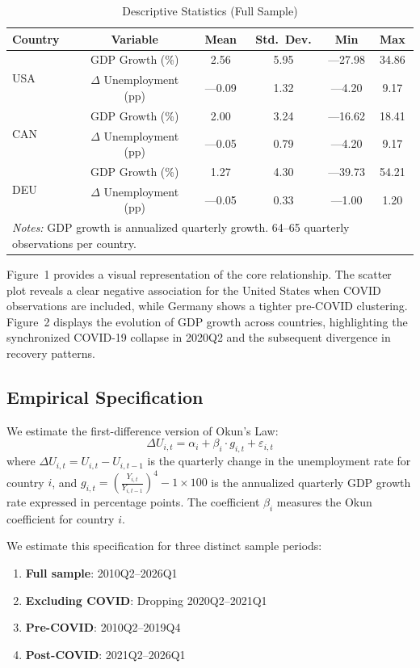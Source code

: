 \documentclass[12pt,a4paper]{article}
\begin{document}
\begin{table}[H]
\centering
\caption{Descriptive Statistics (Full Sample)}
\label{tab:descriptive}
\begin{tabular}{lccccc}
\toprule
Country & Variable & Mean & Std.~Dev. & Min & Max \\
\midrule
\multirow{2}{*}{USA} & GDP Growth (\%) & 2.56 & 5.95 & ---27.98 & 34.86 \\
 & $\Delta$ Unemployment (pp) & ---0.09 & 1.32 & ---4.20 & 9.17 \\
\midrule
\multirow{2}{*}{CAN} & GDP Growth (\%) & 2.00 & 3.24 & ---16.62 & 18.41 \\
 & $\Delta$ Unemployment (pp) & ---0.05 & 0.79 & ---4.20 & 9.17 \\
\midrule
\multirow{2}{*}{DEU} & GDP Growth (\%) & 1.27 & 4.30 & ---39.73 & 54.21 \\
 & $\Delta$ Unemployment (pp) & ---0.05 & 0.33 & ---1.00 & 1.20 \\
\bottomrule
\multicolumn{6}{l}{\textit{Notes:} GDP growth is annualized quarterly growth. 64--65 quarterly observations per country.}
\end{tabular}
\end{table}

Figure~1 provides a visual representation of the core relationship. The scatter plot reveals a clear negative association for the United States when COVID observations are included, while Germany shows a tighter pre-COVID clustering. Figure~2 displays the evolution of GDP growth across countries, highlighting the synchronized COVID-19 collapse in 2020Q2 and the subsequent divergence in recovery patterns.

\subsection{Empirical Specification}

We estimate the first-difference version of Okun's Law:
\[
\Delta U_{i,t} = \alpha_i + \beta_i \cdot g_{i,t} + \varepsilon_{i,t}
\]
where $\Delta U_{i,t} = U_{i,t} - U_{i,t-1}$ is the quarterly change in the unemployment rate for country $i$, and $g_{i,t} = \left(\frac{Y_{i,t}}{Y_{i,t-1}}\right)^4 - 1 \times 100$ is the annualized quarterly GDP growth rate expressed in percentage points. The coefficient $\beta_i$ measures the Okun coefficient for country $i$.

We estimate this specification for three distinct sample periods:
\begin{enumerate}
    \item \textbf{Full sample}: 2010Q2--2026Q1
    \item \textbf{Excluding COVID}: Dropping 2020Q2--2021Q1
    \item \textbf{Pre-COVID}: 2010Q2--2019Q4
    \item \textbf{Post-COVID}: 2021Q2--2026Q1
\end{enumerate}
\end{document}
